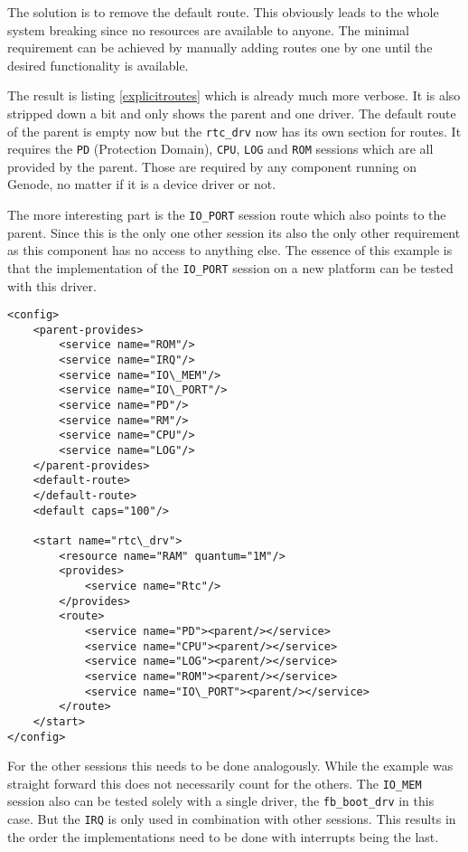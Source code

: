 \documentclass[
a4paper,
12pt,
notitlepage,
parskip=half,
DIV=11,
]{scrbook}
\begin{document}
		The solution is to remove the default route.
		This obviously leads to the whole system breaking since no resources are available to anyone.
		The minimal requirement can be achieved by manually adding routes one by one until the desired functionality is available.
		
		The result is listing \ref{explicitroutes} which is already much more verbose.
		It is also stripped down a bit and only shows the parent and one driver.
		The default route of the parent is empty now but the \texttt{rtc\_drv} now has its own section for routes.
		It requires the \texttt{PD} (Protection Domain), \texttt{CPU}, \texttt{LOG} and \texttt{ROM} sessions which are all provided by the parent.
		Those are required by any component running on Genode, no matter if it is a device driver or not.
		
		The more interesting part is the \texttt{IO\_PORT} session route which also points to the parent.
		Since this is the only one other session its also the only other requirement as this component has no access to anything else.
		The essence of this example is that the implementation of the \texttt{IO\_PORT} session on a new platform can be tested with this driver.

		\begin{lstlisting}[basicstyle=\ttfamily\footnotesize]
<config>
	<parent-provides>
		<service name="ROM"/>
		<service name="IRQ"/>
		<service name="IO\_MEM"/>
		<service name="IO\_PORT"/>
		<service name="PD"/>
		<service name="RM"/>
		<service name="CPU"/>
		<service name="LOG"/>
	</parent-provides>
	<default-route>
	</default-route>
	<default caps="100"/>
		
	<start name="rtc\_drv">
		<resource name="RAM" quantum="1M"/>
		<provides>
			<service name="Rtc"/>
		</provides>
		<route>
			<service name="PD"><parent/></service>
			<service name="CPU"><parent/></service>
			<service name="LOG"><parent/></service>
			<service name="ROM"><parent/></service>
			<service name="IO\_PORT"><parent/></service>
		</route>
	</start>
</config>
		\end{lstlisting}
		
		For the other sessions this needs to be done analogously.
		While the example was straight forward this does not necessarily count for the others.
		The \texttt{IO\_MEM} session also can be tested solely with a single driver, the \texttt{fb\_boot\_drv} in this case.
		But the \texttt{IRQ} is only used in combination with other sessions.
		This results in the order the implementations need to be done with interrupts being the last.
		
\end{document}
